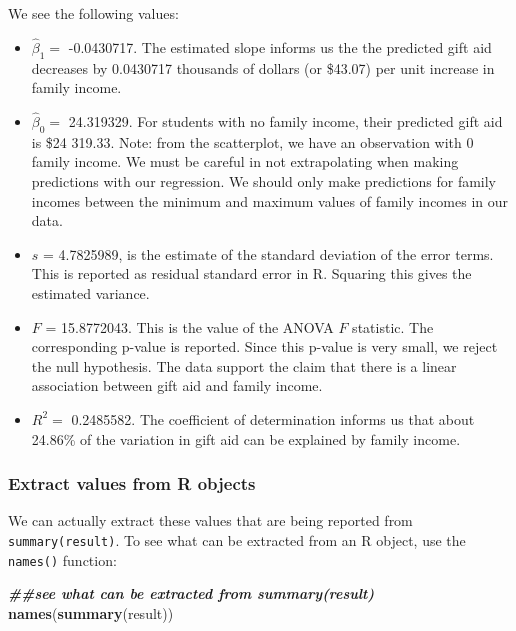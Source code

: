 \documentclass[
]{book}
\newenvironment{Shaded}{\begin{snugshade}}{\end{snugshade}}
\newcommand{\DocumentationTok}[1]{\textcolor[rgb]{0.56,0.35,0.01}{\textbf{\textit{#1}}}}
\newcommand{\FunctionTok}[1]{\textcolor[rgb]{0.13,0.29,0.53}{\textbf{#1}}}
\newcommand{\NormalTok}[1]{#1}
\providecommand{\tightlist}{%
  \setlength{\itemsep}{0pt}\setlength{\parskip}{0pt}}
\begin{document}
We see the following values:

\begin{itemize}
\tightlist
\item
  \(\hat{\beta}_1 =\) -0.0430717. The estimated slope informs us the the predicted gift aid decreases by 0.0430717 thousands of dollars (or \$43.07) per unit increase in family income.
\item
  \(\hat{\beta}_0 =\) 24.319329. For students with no family income, their predicted gift aid is \$24 319.33. Note: from the scatterplot, we have an observation with 0 family income. We must be careful in not extrapolating when making predictions with our regression. We should only make predictions for family incomes between the minimum and maximum values of family incomes in our data.
\item
  \(s\) = 4.7825989, is the estimate of the standard deviation of the error terms. This is reported as residual standard error in R. Squaring this gives the estimated variance.
\item
  \(F\) = 15.8772043. This is the value of the ANOVA \(F\) statistic. The corresponding p-value is reported. Since this p-value is very small, we reject the null hypothesis. The data support the claim that there is a linear association between gift aid and family income.
\item
  \(R^2 =\) 0.2485582. The coefficient of determination informs us that about 24.86\% of the variation in gift aid can be explained by family income.
\end{itemize}

\subsubsection*{Extract values from R objects}\label{extract-values-from-r-objects}

We can actually extract these values that are being reported from \texttt{summary(result)}. To see what can be extracted from an R object, use the \texttt{names()} function:

\begin{Shaded}
\begin{Highlighting}[]
\DocumentationTok{\#\#see what can be extracted from summary(result)}
\FunctionTok{names}\NormalTok{(}\FunctionTok{summary}\NormalTok{(result))}
\end{Highlighting}
\end{Shaded}
\end{document}
